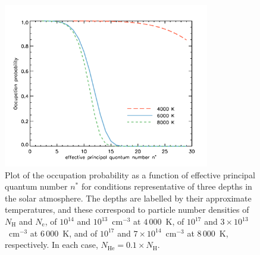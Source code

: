 \documentclass[traditabstract]{aa} %
\begin{document}
  \begin{figure}[ht]
   \centering
   \includegraphics[width=90mm,angle=0]{figures/wplot.pdf}
      \caption{Plot of the occupation probability as a function of effective principal quantum number $n^*$ for conditions representative of three depths in the solar atmosphere.  The depths are labelled by their approximate temperatures, and these correspond to particle number densities of $N_\mathrm{H}$ and $N_\mathrm{e}$, of $10^{14}$ and $10^{13}$~cm$^{-3}$ at $4\,000$~K, of $10^{17}$ and $3 \times 10^{13}$~cm$^{-3}$ at $6\,000$~K, and of $10^{17}$ and $7 \times 10^{14}$~cm$^{-3}$ at $8\,000$~K, respectively.  In each case,   $N_\mathrm{He} = 0.1 \times N_\mathrm{H}$.}
         \label{fig:wplot}
   \end{figure}
\end{document}
